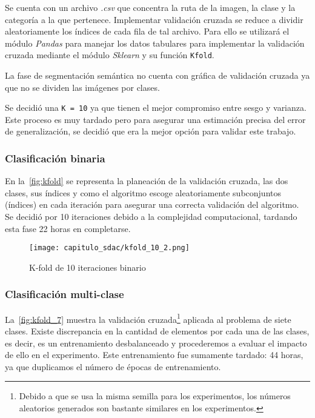 Se cuenta con un archivo \emph{.csv} que concentra la ruta de la imagen, la clase y la
categoría a la que pertenece. Implementar validación cruzada se reduce a dividir
aleatoriamente los índices de cada fila de tal archivo. Para ello se utilizará
el módulo \emph{Pandas} para manejar los datos tabulares para implementar la
validación cruzada mediante el módulo \emph{Sklearn} y su función
\texttt{Kfold}.

La fase de segmentación semántica no cuenta con gráfica de validación cruzada ya
que no se dividen las imágenes por clases.

Se decidió una \texttt{K = 10} ya que tienen el mejor compromiso
entre sesgo y varianza. Este proceso es muy tardado pero para asegurar una
estimación precisa del error de generalización, se decidió que era la mejor
opción para validar este trabajo.

\subsubsection{Clasificación binaria}

En la~\autoref{fig:kfold} se representa la planeación de la validación cruzada,
las dos clases, sus índices y como el algoritmo escoge aleatoriamente
subconjuntos (índices) en cada iteración para asegurar una correcta validación
del algoritmo. Se decidió por 10 iteraciones debido a la complejidad
computacional, tardando esta fase 22 horas en completarse.

\begin{figure}[H]
    \centering
    \texttt{[image: capitulo\_sdac/kfold\_10\_2.png]}
    \caption{K-fold de 10 iteraciones binario}\label{fig:kfold}
\end{figure}

\subsubsection{Clasificación multi-clase}

La~\autoref{fig:kfold_7} muestra la validación cruzada\footnote{Debido a que se
usa la misma semilla para los experimentos, los números aleatorios generados son
bastante similares en los experimentos.} aplicada al problema de siete clases.
Existe discrepancia en la cantidad de elementos por cada una de las clases, es
decir, es un entrenamiento desbalanceado y procederemos a evaluar el impacto de
ello en el experimento. Este entrenamiento fue sumamente tardado: 44 horas, ya
que duplicamos el número de épocas de entrenamiento.

